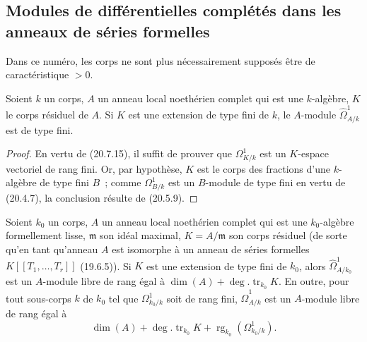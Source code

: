 \subsection{Modules de différentielles complétés dans les anneaux de séries formelles}
\label{subsection:0.21.9-fr}

Dans ce numéro, les corps ne sont plus nécessairement supposés être de
caractéristique $>0$.

\begin{lemma}[21.9.1]
\label{0.21.9.1-fr}
Soient $k$ un corps, $A$ un anneau local noethérien complet qui est une
$k$-algèbre, $K$ le corps résiduel de $A$. Si $K$ est une extension de type
fini de $k$, le $A$-module $\widehat\Omega^1_{A/k}$ est de type fini.
\end{lemma}

\begin{proof}
En vertu de (20.7.15), il suffit de prouver que $\Omega^1_{K/k}$ est un
$K$-espace vectoriel de rang fini. Or, par hypothèse, $K$ est le corps des
fractions d'une $k$-algèbre de type fini $B$~; comme $\Omega^1_{B/k}$ est un
$B$-module de type fini en vertu de (20.4.7), la conclusion résulte de
(20.5.9).
\end{proof}

\begin{proposition}[21.9.2]
\label{0.21.9.2-fr}
Soient $k_0$ un corps, $A$ un anneau local noethérien complet qui est une
$k_0$-algèbre formellement lisse, $\mathfrak m$ son idéal maximal,
$K=A/\mathfrak m$ son corps résiduel (de sorte qu'en tant qu'anneau $A$ est
isomorphe à un anneau de séries formelles $K[[T_1,\ldots,T_r]]$ (19.6.5)).
Si $K$ est une extension de type fini de $k_0$, alors
$\widehat\Omega^1_{A/k_0}$ est un $A$-module libre de rang égal à
$\dim(A)+\deg.\operatorname{tr}_{k_0}K$. En outre, pour tout sous-corps $k$
de $k_0$ tel que $\Omega^1_{k_0/k}$ soit de rang fini,
$\widehat\Omega^1_{A/k}$ est un $A$-module libre de rang égal à
\[
  \dim(A)+\deg.\operatorname{tr}_{k_0}K
  +\operatorname{rg}_{k_0}(\Omega^1_{k_0/k}).
\]
\end{proposition}

